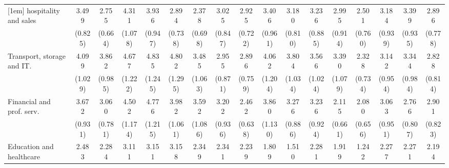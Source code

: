 {\begin{tabular}{l*{16}{c}}
[1em]
hospitality and sales&       3.499\sym{***}&       2.755\sym{***}&       4.311\sym{***}&       3.936\sym{***}&       2.894\sym{***}&       2.378\sym{**} &       3.025\sym{***}&       2.925\sym{***}&       3.406\sym{***}&       3.180\sym{***}&       3.236\sym{***}&       2.995\sym{***}&       2.501\sym{**} &       3.184\sym{***}&       3.399\sym{***}&       2.896\sym{***}\\
                    &     (0.825)         &     (0.664)         &     (1.078)         &     (0.947)         &     (0.738)         &     (0.698)         &     (0.847)         &     (0.722)         &     (0.961)         &     (0.810)         &     (0.885)         &     (0.914)         &     (0.760)         &     (0.939)         &     (0.935)         &     (0.778)         \\
[1em]
Transport, storage and IT.&       4.099\sym{***}&       3.862\sym{***}&       4.677\sym{***}&       4.835\sym{***}&       4.802\sym{***}&       3.485\sym{***}&       2.955\sym{***}&       2.896\sym{***}&       4.062\sym{***}&       3.804\sym{***}&       3.566\sym{***}&       3.390\sym{***}&       2.328\sym{**} &       3.142\sym{***}&       3.344\sym{***}&       2.828\sym{***}\\
                    &     (1.029)         &     (0.985)         &     (1.222)         &     (1.245)         &     (1.295)         &     (1.063)         &     (0.871)         &     (0.759)         &     (1.204)         &     (1.034)         &     (1.024)         &     (1.079)         &     (0.734)         &     (0.954)         &     (0.984)         &     (0.814)         \\
[1em]
Financial and prof. serv.&       3.672\sym{***}&       3.060\sym{***}&       4.502\sym{***}&       4.776\sym{***}&       3.982\sym{***}&       3.592\sym{***}&       3.202\sym{***}&       2.462\sym{***}&       3.860\sym{***}&       3.276\sym{***}&       3.236\sym{***}&       2.115\sym{*}  &       2.080\sym{*}  &       3.063\sym{***}&       2.766\sym{***}&       2.901\sym{***}\\
                    &     (0.931)         &     (0.781)         &     (1.174)         &     (1.215)         &     (1.061)         &     (1.086)         &     (0.936)         &     (0.638)         &     (1.130)         &     (0.886)         &     (0.924)         &     (0.661)         &     (0.656)         &     (0.951)         &     (0.807)         &     (0.823)         \\
[1em]
Education and healthcare&       2.483\sym{***}&       2.284\sym{**} &       3.111\sym{***}&       3.151\sym{***}&       3.158\sym{***}&       2.349\sym{*}  &       2.341\sym{**} &       2.239\sym{**} &       1.809         &       1.510         &       2.281\sym{*}  &       1.919         &       1.242         &       2.277\sym{*}  &       2.271\sym{*}  &       2.194\sym{*}  \\

\end{tabular}}
